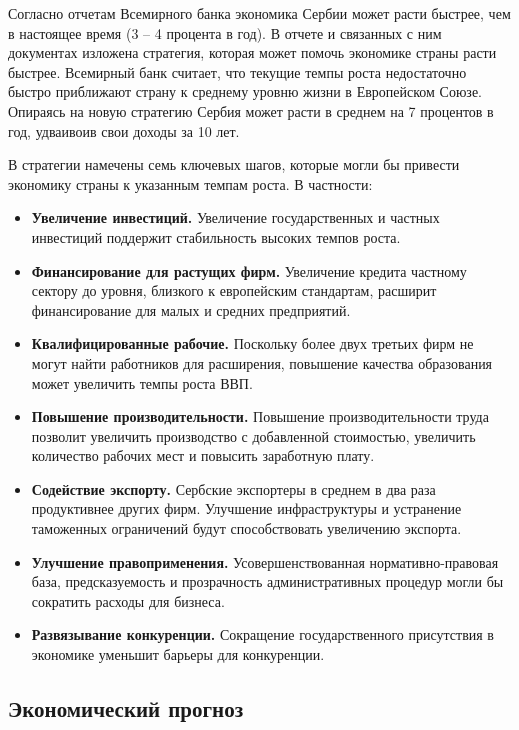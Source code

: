 Согласно отчетам Всемирного банка экономика Сербии может расти быстрее, чем в настоящее время (3 -- 4 процента в год).
В отчете \cite{worldbank_cem} и связанных с ним документах \cite{worldbank_investment,worldbank_financing, worldbank_productivity, worldbank_encouraging, worldbank_labormarket, worldbank_barriers, worldbank_aid, worldbank_workforce} изложена стратегия, которая может помочь экономике страны расти быстрее.
Всемирный банк считает, что текущие темпы роста недостаточно быстро приближают страну к среднему уровню жизни в Европейском Союзе.
Опираясь на новую стратегию Сербия может расти в среднем на 7 процентов в год, удваивоив свои доходы за 10 лет.

В стратегии намечены семь ключевых шагов, которые могли бы привести экономику страны к указанным темпам роста.
В частности:
\begin{itemize}
	\item \textbf{Увеличение инвестиций.}
	Увеличение государственных и частных инвестиций поддержит стабильность высоких темпов роста.
	\item \textbf{Финансирование для растущих фирм.}
	Увеличение кредита частному сектору до уровня, близкого к европейским стандартам, расширит финансирование для малых и средних предприятий.
	\item \textbf{Квалифицированные рабочие.}
	Поскольку более двух третьих фирм не могут найти работников для расширения, повышение качества образования может увеличить темпы роста ВВП.
	\item \textbf{Повышение производительности.}
	Повышение производительности труда позволит увеличить производство с добавленной стоимостью, увеличить количество рабочих мест и повысить заработную плату.
	\item \textbf{Содействие экспорту.}
	Сербские экспортеры в среднем в два раза продуктивнее других фирм.
	Улучшение инфраструктуры и устранение таможенных ограничений будут способствовать увеличению экспорта.
	\item \textbf{Улучшение правоприменения.}
	Усовершенствованная нормативно-правовая база, предсказуемость и прозрачность административных процедур могли бы сократить расходы для бизнеса.
	\item \textbf{Развязывание конкуренции.}
	Сокращение государственного присутствия в экономике уменьшит барьеры для конкуренции.
\end{itemize}

\subsection{Экономический прогноз}

